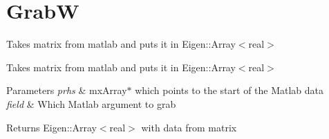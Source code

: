 \hypertarget{group__grabW}{}\section{GrabW}
\label{group__grabW}


Takes matrix from matlab and puts it in Eigen\+::\+Array$<$real$>$  


Takes matrix from matlab and puts it in Eigen\+::\+Array$<$real$>$ 


\begin{DoxyParams}{Parameters}
{\em prhs} & mx\+Array$\ast$ which points to the start of the Matlab data \\
\hline
{\em field} & Which Matlab argument to grab \\
\hline
\end{DoxyParams}
\begin{DoxyReturn}{Returns}
Eigen\+::\+Array$<$real$>$ with data from matrix 
\end{DoxyReturn}
